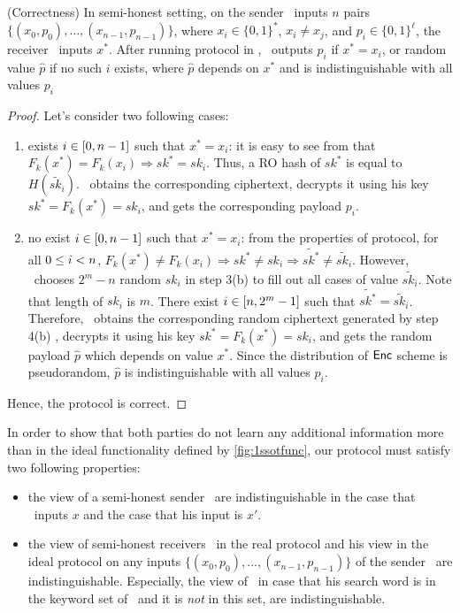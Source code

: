 \begin{theorem} (Correctness)
	\label{thm:sotcorr}
In semi-honest setting, on the sender \SS\ inputs $n$ pairs $\{ (x_0, p_0), \ldots, (x_{n-1}, p_{n-1}) \}$, where $x_i \in \{0,1\}^*$, $x_i \ne x_j$,  and $p_i \in \{0,1\}^\ell$, the receiver \RR\ inputs $x^*$. After running protocol in , \RR\ outputs $p_i$ if $x^*=x_i$, or random value $\hat{p}$ if no such $i$ exists, where $\hat{p}$ depends on $x^*$ and is indistinguishable with all values $p_i$
\end{theorem}
\begin{proof}
	Let's consider two following cases:
	\begin{enumerate}
		\item exists $i \in [0, n-1]$ such that $x^*=x_i$: it is easy to see from \batchOPRF that $F_k(x^*)=F_k(x_i) \Rightarrow sk^* = sk_i$. Thus, a RO hash  of $sk^*$ is equal to $H(\tilde{sk_i})$. \RR\  obtains the corresponding ciphertext, decrypts it using his key $sk^*=F_k(x^*)=sk_i$, and gets the corresponding payload $p_i$.
		
		\item no exist $i \in [0, n-1]$ such that $x^*=x_i$: from the properties of \batchOPRF protocol, for all $0 \leq i < n$,  $F_k(x^*) \ne F_k(x_i) \Rightarrow sk^* \ne sk_i \Rightarrow \tilde{sk^*} \ne \tilde{sk_i}$. However, \SS\ chooses $2^m-n$ random $sk_i$ in step 3(b) to fill out all cases of value $\tilde{sk_i}$. Note that length of $sk_i$ is $m$. There exist $i \in [n, 2^m-1]$ such that $\tilde{sk^*}  = \tilde{sk_i}$. Therefore, \RR\  obtains the corresponding random ciphertext generated by step 4(b) , decrypts it using his key $sk^*=F_k(x^*)=sk_i$, and gets the random payload $\hat{p}$ which depends on value $x^*$. Since the distribution of $\mathsf{Enc}$ scheme is pseudorandom, $\hat{p}$ is indistinguishable with all values $p_i$.
	\end{enumerate}
Hence, the protocol is correct.
\end{proof}


In order to show that both parties do not learn any additional information more than in the ideal functionality defined by \ref{fig:1ssotfunc}, our protocol must satisfy two following properties:
\begin{itemize}
	\item the view of a semi-honest sender \SS\ are indistinguishable in the case that \RR\  inputs $x$ and the case that his input is $x'$.  
	\item  the view of semi-honest receivers \RR\ in the real protocol and his view in the ideal protocol on any inputs $\{ (x_0, p_0), \ldots, (x_{n-1}, p_{n-1}) \}$ of the sender \SS\ are indistinguishable. Especially, the view of \RR\ in case that his search word is in the keyword set of \SS\ and it is \textit{not} in this set, are indistinguishable.
\end{itemize}


